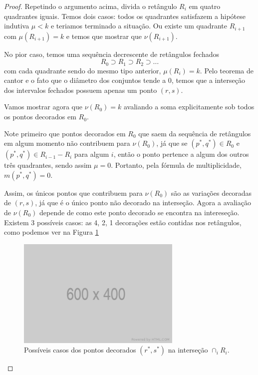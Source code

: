 \begin{proof}
Repetindo o argumento acima, divida o retângulo $R_i$ em quatro quadrantes iguais. Temos dois
casos: todos os quadrantes satisfazem a hipótese indutiva $\mu<k$ e teriamos terminado a situação.
Ou existe um quadrante $R_{i+1}$ com $\mu(R_{i+1})=k$ e temos que mostrar que $\nu(R_{i+1})$.

No pior caso, temos uma sequência decrescente de retângulos fechados
\begin{equation*}
    R_0 \supset R_1 \supset R_2 \supset \dots
\end{equation*}
com cada quadrante sendo do mesmo tipo anterior, $\mu(R_i) = k$. Pelo teorema de cantor e o fato
que o diâmetro dos conjuntos tende a $0$, temos que a interseção dos intervalos fechados possuem
apenas um ponto $(r,s)$.

Vamos mostrar agora que $\nu(R_0) = k$ avaliando a soma explicitamente sob todos os pontos decorados
em $R_0$.

Note primeiro que pontos decorados em $R_0$ que saem da sequência de retângulos em algum momento não
contribuem para $\nu(R_0)$, já que se $(p^*, q^*) \in R_0$ e $(p^*, q^*) \in R_{i-1} - R_i$ para 
algum $i$, então o ponto pertence a algum dos outros três quadrantes, sendo assim $\mu = 0$. 
Portanto, pela fórmula de multiplicidade, $m(p^*, q^*) = 0$. 

Assim, os únicos pontos que contribuem para $\nu(R_0)$ são as variações decoradas de $(r,s)$, já 
que é o único ponto não decorado na interseção. Agora a avaliação de $\nu(R_0)$ depende de como 
este ponto decorado se encontra na intereseção. Existem 3 possíveis casos: as 4, 2, 1 decorações
estão contidas nos retângulos, como podemos ver na Figura \ref{fig:proof_rect}

\begin{figure}[htpb!]
    \centering
    \includegraphics[width=0.7\textwidth]{images/placeholder.png}
    \caption{Possíveis casos dos pontos decorados $(r^*, s^*)$ na interseção $\cap_i R_i$.}
    \label{fig:proof_rect}
    \fautor
\end{figure}


\end{proof}
